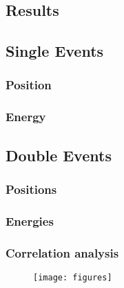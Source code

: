 \subsection{Results}
\subsection{Single Events}
\subsubsection{Position}
\subsubsection{Energy}
\subsection{Double Events}
\subsubsection{Positions}
\subsubsection{Energies}
\subsubsection{Correlation analysis}
\begin{figure}
    \texttt{[image: figures]}
    \caption{}
    \label{}
\end{figure}
